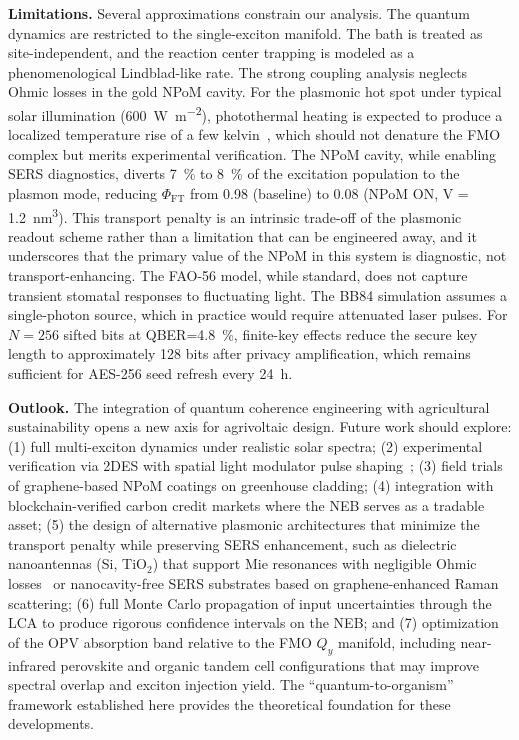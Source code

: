 \documentclass[12pt]{article}
\begin{document}
\textbf{Limitations.} Several approximations constrain our analysis.
The quantum dynamics are restricted to the single-exciton manifold.
The bath is treated as site-independent, and the reaction center trapping is modeled as a phenomenological Lindblad-like rate. The strong coupling analysis neglects Ohmic losses in the gold NPoM cavity. For the plasmonic hot spot under typical solar illumination (\SI{600}{\W\per\m\squared}), photothermal heating is expected to produce a localized temperature rise of a few kelvin~\cite{Baffou2020}, which should not denature the FMO complex but merits experimental verification.
The NPoM cavity, while enabling SERS diagnostics, diverts \SI{7}{\percent} to \SI{8}{\percent} of the excitation population to the plasmon mode, reducing $\Phi_{\mathrm{FT}}$ from \num{0.98} (baseline) to \num{0.08} (NPoM ON, V = \SI{1.2}{\nm\cubed}). This transport penalty is an intrinsic trade-off of the plasmonic readout scheme rather than a limitation that can be engineered away, and it underscores that the primary value of the NPoM in this system is diagnostic, not transport-enhancing.
The FAO-56 model, while standard, does not capture transient stomatal responses to fluctuating light.
The BB84 simulation assumes a single-photon source, which in practice would require attenuated laser pulses. For $N=256$ sifted bits at QBER=\SI{4.8}{\percent}, finite-key effects reduce the secure key length to approximately \num{128} bits after privacy amplification, which remains sufficient for AES-256 seed refresh every \SI{24}{\hour}.

\textbf{Outlook.} The integration of quantum coherence engineering with agricultural sustainability opens a new axis for agrivoltaic design.
Future work should explore: (1) full multi-exciton dynamics under realistic solar spectra; (2) experimental verification via 2DES with spatial light modulator pulse shaping~\cite{Gunthardt2023,Sebastian2024}; (3) field trials of graphene-based NPoM coatings on greenhouse cladding; (4) integration with blockchain-verified carbon credit markets where the NEB serves as a tradable asset; (5) the design of alternative plasmonic architectures that minimize the transport penalty while preserving SERS enhancement, such as dielectric nanoantennas (Si, TiO$_2$) that support Mie resonances with negligible Ohmic losses~\cite{Caldarola2015} or nanocavity-free SERS substrates based on graphene-enhanced Raman scattering; (6) full Monte Carlo propagation of input uncertainties through the LCA to produce rigorous confidence intervals on the NEB; and (7) optimization of the OPV absorption band relative to the FMO $Q_y$ manifold, including near-infrared perovskite and organic tandem cell configurations that may improve spectral overlap and exciton injection yield.
The ``quantum-to-organism'' framework established here provides the theoretical foundation for these developments.
\end{document}
